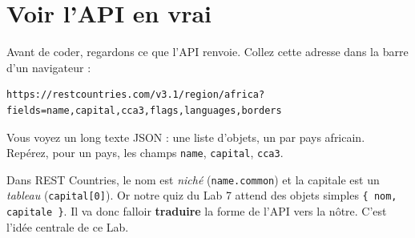 \documentclass[11pt,a4paper]{article}
\newcommand{\code}[1]{\texttt{#1}}
\begin{document}
\section{Voir l'API en vrai}

Avant de coder, regardons ce que l'API renvoie. Collez cette adresse dans la barre d'un navigateur :

\begin{lstlisting}[style=html]
https://restcountries.com/v3.1/region/africa?fields=name,capital,cca3,flags,languages,borders
\end{lstlisting}

Vous voyez un long texte JSON : une liste d'objets, un par pays africain. Repérez, pour un pays, les champs \code{name}, \code{capital}, \code{cca3}.

\begin{attentionbox}
Dans REST Countries, le nom est \emph{niché} (\code{name.common}) et la capitale est un \emph{tableau} (\code{capital[0]}). Or notre quiz du Lab 7 attend des objets simples \code{\{ nom, capitale \}}. Il va donc falloir \textbf{traduire} la forme de l'API vers la nôtre. C'est l'idée centrale de ce Lab.
\end{attentionbox}

\begin{center}
\end{center}
\end{document}
